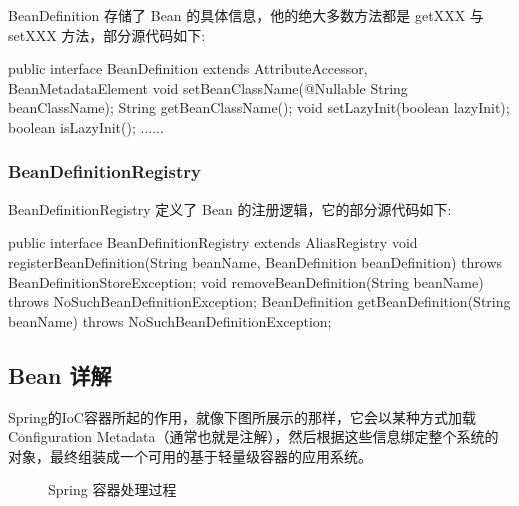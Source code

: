 BeanDefinition 存储了 Bean 的具体信息，他的绝大多数方法都是 getXXX 与 setXXX 方法，部分源代码如下:
\begin{Java}
public interface BeanDefinition extends AttributeAccessor, BeanMetadataElement {
    void setBeanClassName(@Nullable String beanClassName);
    String getBeanClassName();
    void setLazyInit(boolean lazyInit);
    boolean isLazyInit();
    ......
}
\end{Java}

\subsubsection*{BeanDefinitionRegistry}

BeanDefinitionRegistry 定义了 Bean 的注册逻辑，它的部分源代码如下:

\begin{Java}
public interface BeanDefinitionRegistry extends AliasRegistry {
    void registerBeanDefinition(String beanName, BeanDefinition beanDefinition)
			throws BeanDefinitionStoreException;
    void removeBeanDefinition(String beanName) throws NoSuchBeanDefinitionException;
    BeanDefinition getBeanDefinition(String beanName) throws NoSuchBeanDefinitionException;
}
\end{Java}

\subsection{Bean 详解}

Spring的IoC容器所起的作用，就像下图所展示的那样，它会以某种方式加载Configuration Metadata（通常也就是注解），然后根据这些信息绑定整个系统的对象，最终组装成一个可用的基于轻量级容器的应用系统。

\begin{figure}[H]
    \small
    \centering
    \caption{Spring 容器处理过程}
    \label{fig:Spring 容器处理过程}
\end{figure}

